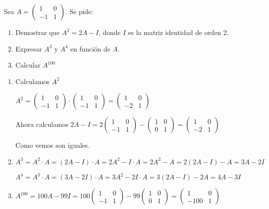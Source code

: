 \begin{ejemplo}
Sea $A=\begin{pmatrix}
1 & 0 \\
-1 & 1
\end{pmatrix}$. Se pide:
\begin{enumerate}[label={\alph* ) }]
\item Demostrar que $A^2=2A-I$, donde $I$ es la matriz identidad de orden 2.
\item Expresar $A^3$ y $A^4$ en función de $A$.
\item Calcular $A^{100}$
\end{enumerate}


\tcblower

\begin{enumerate}[label={\alph* ) }]
\item Calculamos $A^2$

$A^2=\begin{pmatrix}
1 & 0 \\
-1 & 1
\end{pmatrix} \cdot\begin{pmatrix}
1 & 0 \\
-1 & 1
\end{pmatrix}= \begin{pmatrix}
1 & 0 \\
-2 & 1
\end{pmatrix}$

Ahora calculamos $2A-I=2\begin{pmatrix}
1 & 0 \\
-1 & 1
\end{pmatrix}-
\begin{pmatrix}
1 & 0 \\
0 & 1
\end{pmatrix}=\begin{pmatrix}
1 & 0 \\
-2 & 1
\end{pmatrix}$

Como vemos son iguales.

\item

$A^3=A^2\cdot A= (2A-I)\cdot A= 2A^2-I\cdot A=2A^2-A=2(2A-I)-A=3A-2I$

$A^4=A^3\cdot A=(3A-2I)\cdot A=3A^2-2I\cdot A= 3(2A-I)-2A=4A-3I$ 
\item 

$A^{100}=100A-99I=100\begin{pmatrix}
1 & 0 \\
-1 & 1
\end{pmatrix}-
99\begin{pmatrix}
1 & 0 \\
0 & 1
\end{pmatrix}=
\begin{pmatrix}
1 & 0 \\
-100 & 1
\end{pmatrix}$
\end{enumerate}

\end{ejemplo}

